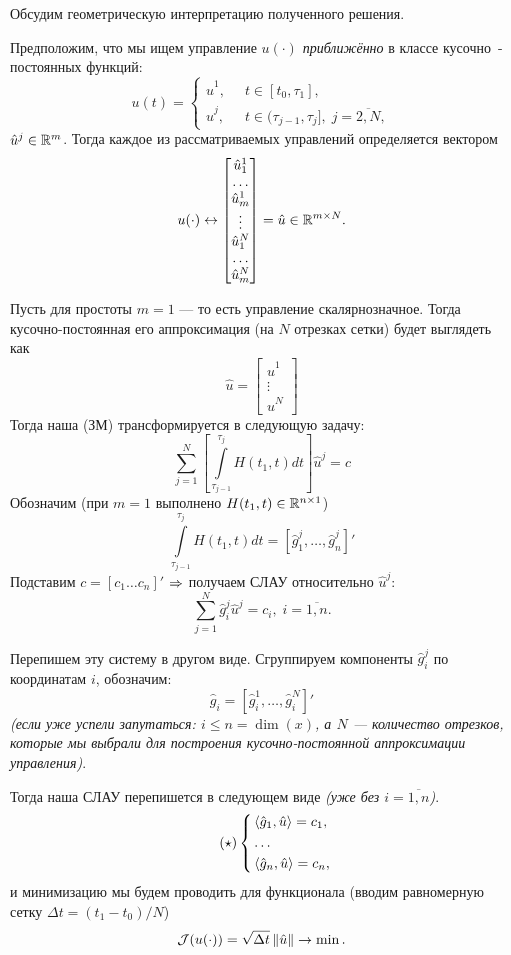 Обсудим геометрическую интерпретацию полученного решения.

Предположим, что мы ищем управление $u(\cdot)$ \textit{приближённо} в классе кусочно~-постоянных функций:
$$
u(t) = \left\{
    \begin{aligned}
        \hat{u}^1, & \;\; t \in [t_0, \tau_1],\\
        \hat{u}^j, & \;\; t \in (\tau_{j-1}, \tau_{j}], \; j = \overline{2, N},
    \end{aligned}
\right.
$$
$\hat{u}^j \in \mathbb{R}^m$. Тогда каждое из рассматриваемых управлений определяется вектором
$$
u(\cdot) \leftrightarrow \begin{bmatrix}
    \hat{u}^1_1 \\ \ldots \\ \hat{u}^1_m \\ \vdots \\ \hat{u}^N_1 \\ \ldots \\ \hat{u}^N_m
\end{bmatrix} = \hat{u} \in \mathbb{R}^{m \times N}.
$$

Пусть для простоты $m = 1$ --- то есть управление скалярнозначное. Тогда кусочно-постоянная его аппроксимация (на $N$ отрезках сетки) будет выглядеть как
$$
\hat{u} = \begin{bmatrix}
    \hat{u}^1 \\ \vdots \\ \hat{u}^N
\end{bmatrix}
$$
Тогда наша (ЗМ) трансформируется в следующую задачу:
$$
\sum\limits_{j=1}^{N} \left[ \int\limits_{\tau_{j-1}}^{\tau_j} H(t_1, t) dt \right] \hat{u}^j = c
$$
Обозначим (при $m = 1$ выполнено ${H(t_1, t) \in \mathbb{R}^{n \times 1}}$)
$$
\int\limits_{\tau_{j-1}}^{\tau_j} H(t_1, t) dt = [\hat{g}^j_1, \ldots, \hat{g}^j_n]'
$$
Подставим $c = [c_1  \ldots c_n]'$ $\operatorname*{\Rightarrow}$ получаем СЛАУ относительно $\hat{u}^j$:
$$
\sum\limits_{j=1}^{N} \hat{g}^j_i \hat{u}^j = c_i, \; i = \overline{1, n}.
$$

Перепишем эту систему в другом виде.
Сгруппируем компоненты $\hat{g}^j_i$ по координатам $i$, обозначим:
$$
\hat{g}_i = [\hat{g}^1_i, \ldots,  \hat{g}^N_i]'
$$
\textit{(если уже успели запутаться: $i \leqslant n = \dim(x)$, а $N$ --- количество отрезков, которые мы выбрали для построения кусочно-постоянной аппроксимации управления)}.

Тогда наша СЛАУ перепишется в следующем виде \textit{(уже без $i = \overline{1, n}$)}.
\begin{equation} \tag{$\star$}
\left\{
    \begin{aligned}
        & \left < \hat{g}_1, \hat{u} \right > = c_1, \\
        & \ldots\\
        & \left < \hat{g}_n, \hat{u} \right > = c_n,
    \end{aligned}
\right.
\end{equation}
и минимизацию мы будем проводить для функционала (вводим равномерную сетку $\Delta t = (t_1 - t_0) / N$)
$$
\mathcal{J}(u(\cdot)) = \sqrt{\Delta t} \left\lVert \hat{u} \right\rVert \to \min.
$$